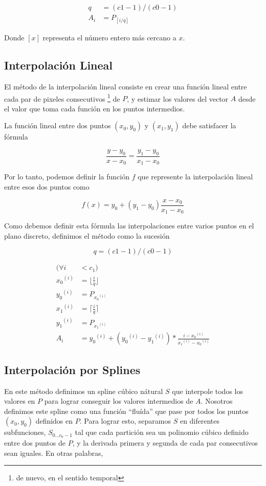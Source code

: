 \[
\begin{split}
q & = (c1 - 1) / (c0 - 1) \\
A_i & = P_{\left[i / q \right]}
\end{split}
\]

Donde $\left[x\right]$ representa el n\'umero entero m\'as cercano a $x$.

\subsection{Interpolaci\'on Lineal}

El m\'etodo de la interpolaci\'on lineal consiste en crear una funci\'on lineal
entre cada par de pixeles consecutivos \footnote{de nuevo, en el sentido
temporal} de $P$, y estimar los valores del vector $A$ desde el valor que toma
cada funci\'on en los puntos intermedios.

La funci\'on lineal entre dos puntos $\left(x_0, y_0\right)$ y $\left(x_1,
y_1\right)$ debe satisfacer la f\'ormula

\[
\frac{y - y_0}{x - x_0} = \frac{y_1 - y_0}{x_1 - x_0}
\]

Por lo tanto, podemos definir la funci\'on $f$ que represente la interpolaci\'on
lineal entre esos dos puntos como

\[
f(x) = y_0 + (y_1 - y_0) \frac{x - x_0}{x_1 - x_0}
\]

Como debemos definir esta f\'ormula las interpolaciones entre varios puntos en
el plano discreto, definimos el m\'etodo como la sucesi\'on

\[
q = (c1 - 1) / (c0 - 1)
\]

\[
\begin{split}
(\forall i & < c_1) \\
{x_0}^{(i)} & = \lfloor \frac{i}{q} \rfloor \\
{y_0}^{(i)} & = P_{{x_0}^{(i)}} \\
{x_1}^{(i)} & = \lceil \frac{i}{q} \rceil \\
{y_1}^{(i)} & = P_{{x_1}^{(i)}} \\
A_i & = {y_0}^{(i)} + ({y_0}^{(i)} - {y_1}^{(i)}) * \frac{i - {x_0}^{(i)}}{{x_1}^{(i)} - {x_0}^{(i)}}
\end{split}
\]

\subsection{Interpolaci\'on por Splines}

En este m\'etodo definimos un spline c\'ubico n\'atural $S$ que interpole todos
los valores en $P$ para lograr conseguir los valores intermedios de $A$.
Nosotros definimos este spline como una funci\'on ``flu\'ida'' que pase por
todos los puntos $(x_0, y_0)$ definidos en $P$. Para lograr esto, separamos $S$
en diferentes subfunciones, $S_{0 \ldots c_0 - 1}$ tal que cada partici\'on sea
un polinomio c\'ubico definido entre dos puntos de $P$, y la derivada primera y
segunda de cada par consecutivos sean iguales. En otras palabras,

